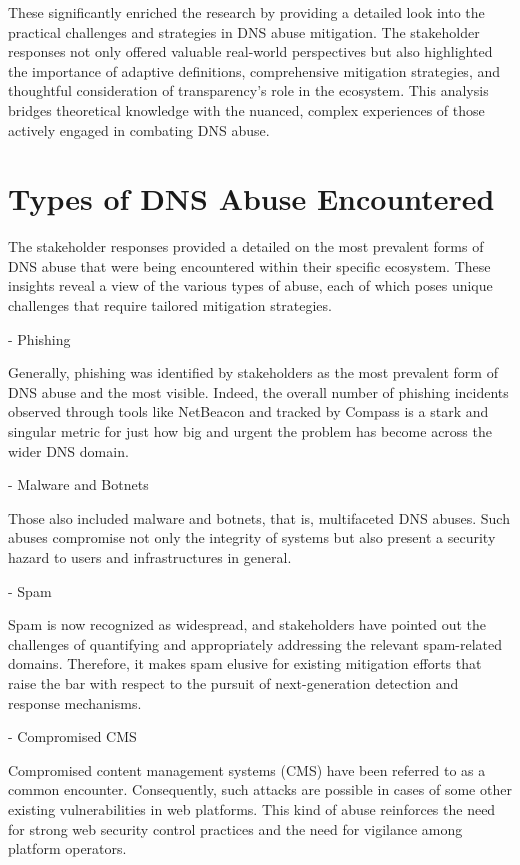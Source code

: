  These significantly enriched the research by providing a detailed look into the practical challenges and strategies in DNS abuse mitigation. The stakeholder responses not only offered valuable real-world perspectives but also highlighted the importance of adaptive definitions, comprehensive mitigation strategies, and thoughtful consideration of transparency's role in the ecosystem. This analysis bridges theoretical knowledge with the nuanced, complex experiences of those actively engaged in combating DNS abuse.

\section{Types of DNS Abuse Encountered} 

The stakeholder responses provided a detailed on the most prevalent forms of DNS abuse that were being encountered within their specific ecosystem. These insights reveal a view of the various types of abuse, each of which poses unique challenges that require tailored mitigation strategies.

- Phishing 

Generally, phishing was identified by stakeholders as the most prevalent form of DNS abuse and the most visible. Indeed, the overall number of phishing incidents observed through tools like NetBeacon and tracked by Compass is a stark and singular metric for just how big and urgent the problem has become across the wider DNS domain.

- Malware and Botnets

Those also included malware and botnets, that is, multifaceted DNS abuses. Such abuses compromise not only the integrity of systems but also present a security hazard to users and infrastructures in general.

- Spam

Spam is now recognized as widespread, and stakeholders have pointed out the challenges of quantifying and appropriately addressing the relevant spam-related domains. Therefore, it makes spam elusive for existing mitigation efforts that raise the bar with respect to the pursuit of next-generation detection and response mechanisms.

- Compromised CMS

Compromised content management systems (CMS) have been referred to as a common encounter. Consequently, such attacks are possible in cases of some other existing vulnerabilities in web platforms. This kind of abuse reinforces the need for strong web security control practices and the need for vigilance among platform operators.


